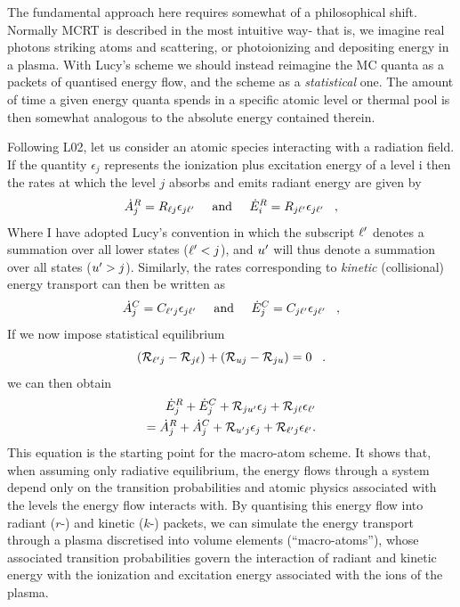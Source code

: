 The fundamental approach here requires somewhat of a philosophical shift.
Normally MCRT is described in the most intuitive way- that is, we imagine
real photons striking atoms and scattering, or photoionizing 
and depositing energy in a plasma. With Lucy's scheme we should instead 
reimagine the MC quanta as a packets of quantised energy flow, and the scheme as a 
{\em statistical} one. The amount of time a given energy quanta spends in a specific atomic
level or thermal pool is then somewhat analogous to the absolute energy 
contained therein.

Following L02, let us consider an atomic species interacting with a radiation field.
If the quantity $\epsilon_j$ represents the ionization plus excitation energy of 
a level i then the rates at which the level $j$ absorbs and emits radiant energy 
are given by
\begin{equation}
 \dot{A}_{j}^{R} = R_{\ell j} \epsilon_{j {\ell^\prime}} \;\;\;\;\; {\rm and} \;\;\;
\;\;  \dot{E}_{i}^{R} = R_{j {\ell^\prime}} \epsilon_{j {\ell^\prime}} \;\;\; ,
\end{equation}
Where I have adopted Lucy's convention in which the subscript 
${\ell^\prime}$ denotes a summation over all lower states (${\ell^\prime}<j$), and
${u^\prime}$ will thus denote a summation over all states (${u^\prime}>j$).
Similarly, the rates corresponding to {\em kinetic} (collisional)
energy transport can then be written as
\begin{equation}
 \dot{A}_{j}^{C} = C_{{\ell^\prime} j} \epsilon_{j {\ell^\prime}} \;\;\;\;\; {\rm and}
\;\;\;
\;\;  \dot{E}_{j}^{C} = C_{j {\ell^\prime}} \epsilon_{j {\ell^\prime}} \;\;\; ,
\end{equation}
If we now impose statistical equilibrium
%
\begin{equation}
 ({\cal R}_{{\ell^\prime} j}-{\cal R}_{j \ell})+({\cal R}_{uj}-{\cal R}_{ju})=0 \;\;\;.
\end{equation}
we can then obtain 
\begin{eqnarray}
 \dot{E}_{j}^{R}+\dot{E}_{j}^{C}+{\cal R}_{j{u^\prime}}\epsilon_{j}+
 {\cal R}_{j \ell}\epsilon_{{\ell^\prime}}  \nonumber \\  
 = \dot{A}_{j}^{R}+\dot{A}_{j}^{C}+{\cal R}_{{u^\prime} j} \epsilon_{j}
 +{\cal R}_{{\ell^\prime} j} \epsilon_{{\ell^\prime}}           .  
 \label{eq:matom_SE}     
\end{eqnarray}
This equation is the starting point for the macro-atom scheme. It shows 
that, when assuming only radiative equilibrium, the energy flows through
a system depend only on the transition probabilities and atomic physics
associated with the levels the energy flow interacts with.
By quantising this energy flow into radiant ($r$-) and kinetic ($k$-) packets, 
we can simulate the energy transport through
a plasma discretised into volume elements (``macro-atoms''),
whose associated transition probabilities govern the interaction 
of radiant and kinetic energy with the ionization and excitation energy associated 
with the ions of the plasma.

